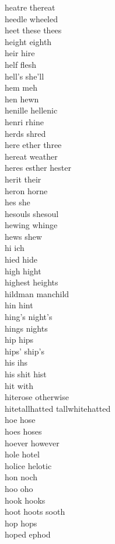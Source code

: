 heatre thereat \\
heedle wheeled \\
heet these thees \\
height eighth\\
heir hire\\
helf flesh \\
hell's she'll\\
hem meh\\
hen hewn \\
henille hellenic \\
henri rhine\\
herds shred\\
here ether three \\
hereat weather \\
heres esther hester \\
herit their\\
heron horne\\
hes she\\
hesouls shesoul\\
hewing whinge\\
hews shew\\
hi ich \\
hied hide\\
high hight \\
highest heights\\
hildman manchild \\
hin hint \\
hing's night's \\
hings nights \\
hip hips \\
hips' ship's \\
his ihs\\
his shit hist \\
hit with \\
hiterose otherwise \\
hitetallhatted tallwhitehatted \\
hoe hose \\
hoes hoses \\
hoever however \\
hole hotel \\
holice helotic \\
hon noch \\
hoo oho\\
hook hooks \\
hoot hoots sooth \\
hop hops \\
hoped ephod\\
